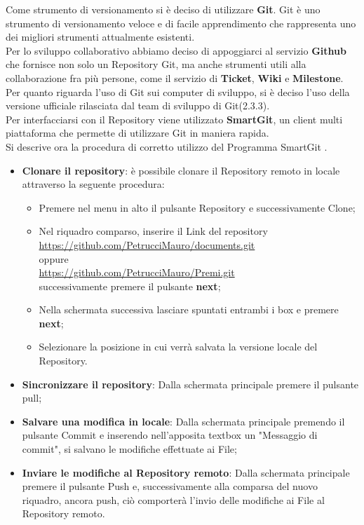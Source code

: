 Come strumento di versionamento si è deciso di utilizzare \textbf{Git}.
Git è uno strumento di versionamento veloce e di facile apprendimento che
rappresenta uno dei migliori strumenti attualmente esistenti.\\ Per lo sviluppo collaborativo abbiamo deciso di appoggiarci al servizio \textbf{Github} che fornisce non solo un Repository Git, ma anche strumenti utili alla collaborazione fra più persone, come il servizio di \textbf{Ticket}, \textbf{Wiki} e \textbf{Milestone}.\\
Per quanto riguarda l’uso di Git sui computer di sviluppo, si è deciso l’uso
della versione ufficiale rilasciata dal team di sviluppo di Git(2.3.3).\\
Per interfacciarsi con il Repository viene utilizzato \textbf{SmartGit}, un client multi piattaforma che permette di utilizzare Git in maniera rapida.\\
Si descrive ora la procedura di corretto utilizzo del Programma SmartGit .
\begin{itemize}

\item 	\textbf{Clonare il repository}: è possibile clonare il Repository remoto in locale attraverso la seguente procedura:

\begin{itemize}
\item Premere nel menu in alto il pulsante Repository e successivamente Clone;
\item Nel riquadro comparso, inserire il Link del repository\\ \url{https://github.com/PetrucciMauro/documents.git}\\
oppure\\
\url{https://github.com/PetrucciMauro/Premi.git}\\
successivamente premere il pulsante \textbf{next};
\item Nella schermata successiva lasciare spuntati entrambi i box e premere \textbf{next};
\item Selezionare la posizione in cui verrà salvata la versione locale del Repository.
\end{itemize}
\item \textbf{Sincronizzare il repository}: Dalla schermata principale premere il pulsante pull; 
\item \textbf{Salvare una modifica in locale}: Dalla schermata principale premendo il pulsante Commit e inserendo nell'apposita textbox un "Messaggio di commit", si salvano le modifiche effettuate ai File;
\item \textbf{Inviare le modifiche al Repository remoto}: Dalla schermata principale premere il pulsante Push e, successivamente alla comparsa del nuovo riquadro, ancora push, ciò comporterà l'invio delle modifiche ai File al Repository remoto.

\end{itemize}

